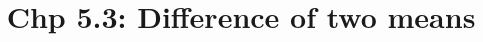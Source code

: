 \documentclass[11pt,containsverbatim,handout]{beamer}
\title[Chp 5.3: Difference of two means]{Chp 5.3: Difference of two means}
\begin{document}
\section{}
\end{document}
